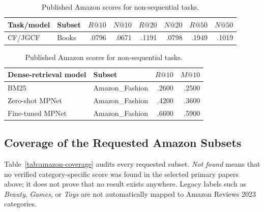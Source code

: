 \begin{table}[H]
\centering
\caption{Published Amazon scores for non-sequential tasks.}
\label{tab:amazon-other-tasks}
\footnotesize
\begin{tabular}{@{}llrrrrrr@{}}
\toprule
Task/model & Subset & $R@10$ & $N@10$ & $R@20$ & $N@20$ & $R@50$ & $N@50$ \\
\midrule
CF/JGCF & Books & .0796 & .0671 & .1191 & .0798 & .1949 & .1019 \\
\bottomrule
\end{tabular}

\vspace{0.8em}
\begin{tabular}{@{}llrr@{}}
\toprule
Dense-retrieval model & Subset & $R@10$ & $M@10$ \\
\midrule
BM25 & Amazon\_Fashion & .2600 & .2500 \\
Zero-shot MPNet & Amazon\_Fashion & .4200 & .3600 \\
Fine-tuned MPNet & Amazon\_Fashion & .6600 & .5900 \\
\bottomrule
\end{tabular}
\end{table}

\subsection{Coverage of the Requested Amazon Subsets}

Table~\ref{tab:amazon-coverage} audits every requested subset. \emph{Not found}
means that no verified category-specific score was found in the selected
primary papers above; it does not prove that no result exists anywhere. Legacy
labels such as \emph{Beauty}, \emph{Games}, or \emph{Toys} are not
automatically mapped to Amazon Reviews 2023 categories.


